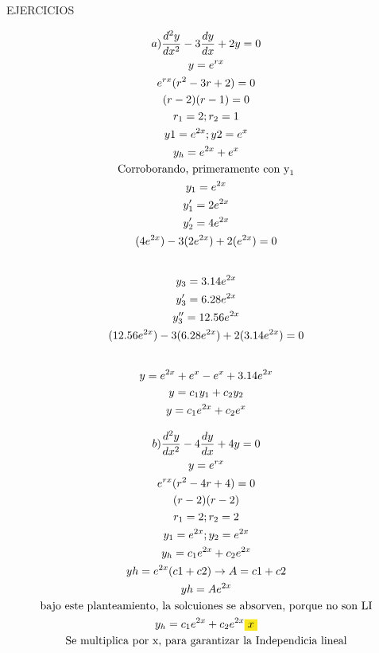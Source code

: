 \documentclass{article}
\begin{document}
EJERCICIOS


\begin{gather*}
a) \frac{d^{2}y}{dx^{2}}-3\frac{dy}{dx}+2y = 0 \\
y = e^{rx} \\
e^{rx}(r^{2}-3r+2) =0 \\
(r-2)(r-1) =0 \\
r_{1}=2; r_{2}=1 \\
y1 = e^{2x}; y2 =e^{x} \\
y_{h} = e^{2x}+ e^{x} \\
\text{Corroborando, primeramente con y}_{1} \\
y_{1} = e^{2x} \\
y_{1}' = 2e^{2x} \\
y_{2}' = 4e^{2x} \\
(4e^{2x})-3(2e^{2x})+2(e^{2x}) = 0 \\
\vspace{0.5em} \\
y_{3} = 3.14e^{2x} \\
y_{3}' = 6.28e^{2x} \\
y_{3}'' = 12.56e^{2x} \\
( 12.56e^{2x})-3(6.28e^{2x})+2(3.14e^{2x}) = 0 \\
\vspace{0.5em} \\
y = e^{2x}+e^{x}-e^{x}+ 3.14e^{2x} \\
y = c_{1}y_{1}+c_{2}y_{2} \\
y = c_{1}e^{2x}+c_{2}e^{x}
\end{gather*}
 




\begin{gather*}
b) \frac{d^{2}y}{dx^{2}}-4\frac{dy}{dx}+4y = 0 \\
y = e^{rx} \\
e^{rx}(r^{2}-4r+4) =0 \\
(r-2)(r-2) \\
r_{1} =2; r_{2}=2 \\
y_{1}=e^{2x}; y_{2}=e^{2x} \\
y_{h} = c_{1}e^{2x}+c_{2}e^{2x} \\
yh = e^{2x}(c1+c2)   \rightarrow A = c1+c2 \\
yh = Ae^{2x} \\
\text{bajo este planteamiento, la solcuiones se absorven, porque no son LI} \\
y_{h} = c_{1}e^{2x}+c_{2}e^{2x}\text{\colorbox[RGB]{248,231,28}{$x$}}  \\
\text{Se multiplica por x, para garantizar la Independicia lineal}
\end{gather*}
\end{document}
